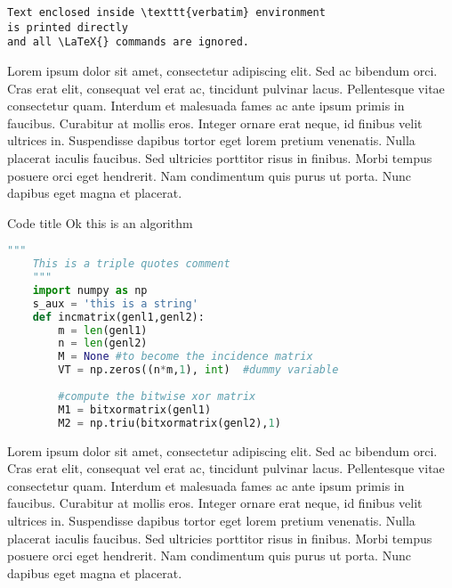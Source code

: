 \documentclass[./main.tex]{subfiles}
\begin{document}
\begin{verbatim}
Text enclosed inside \texttt{verbatim} environment 
is printed directly 
and all \LaTeX{} commands are ignored.
\end{verbatim}

\par Lorem ipsum dolor sit amet, consectetur adipiscing elit. Sed ac bibendum orci. Cras erat elit, consequat vel erat ac, tincidunt pulvinar lacus. Pellentesque vitae consectetur quam. Interdum et malesuada fames ac ante ipsum primis in faucibus. Curabitur at mollis eros. Integer ornare erat neque, id finibus velit ultrices in. Suspendisse dapibus tortor eget lorem pretium venenatis. Nulla placerat iaculis faucibus. Sed ultricies porttitor risus in finibus. Morbi tempus posuere orci eget hendrerit. Nam condimentum quis purus ut porta. Nunc dapibus eget magna et placerat.


\begin{algbox}[
    label={mynamelabel2},
    nameref={Title or anything else}
    ]{Code title}
    Ok this is an algorithm
    \tcblower
    \begin{lstlisting}[language=Python]
    """
    This is a triple quotes comment
    """
    import numpy as np
    s_aux = 'this is a string'
    def incmatrix(genl1,genl2):
        m = len(genl1)
        n = len(genl2)
        M = None #to become the incidence matrix
        VT = np.zeros((n*m,1), int)  #dummy variable
        
        #compute the bitwise xor matrix
        M1 = bitxormatrix(genl1)
        M2 = np.triu(bitxormatrix(genl2),1) 
    \end{lstlisting}
    \label{box:02}
\end{algbox}

\par Lorem ipsum dolor sit amet, consectetur adipiscing elit. Sed ac bibendum orci. Cras erat elit, consequat vel erat ac, tincidunt pulvinar lacus. Pellentesque vitae consectetur quam. Interdum et malesuada fames ac ante ipsum primis in faucibus. Curabitur at mollis eros. Integer ornare erat neque, id finibus velit ultrices in. Suspendisse dapibus tortor eget lorem pretium venenatis. Nulla placerat iaculis faucibus. Sed ultricies porttitor risus in finibus. Morbi tempus posuere orci eget hendrerit. Nam condimentum quis purus ut porta. Nunc dapibus eget magna et placerat.
\end{document}
